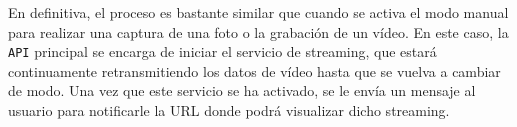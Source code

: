 En definitiva, el proceso es bastante similar que cuando se activa el modo manual para realizar una captura de una foto o la grabación de un vídeo. En este caso, la \texttt{API} principal se encarga de iniciar el servicio de streaming, que estará continuamente retransmitiendo los datos de vídeo hasta que se vuelva a cambiar de modo. Una vez que este servicio se ha activado, se le envía un mensaje al usuario para notificarle la URL donde podrá visualizar dicho streaming.